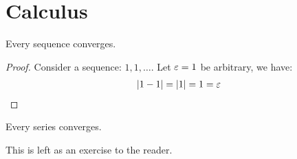 \setcounter{section}{0}

\section{Calculus}

\begin{thm}
  Every sequence converges.
\end{thm}
\begin{proof}
  Consider a sequence: $1,1,\ldots$. Let $\varepsilon=1$ be arbitrary, 
  we have:
  \begin{align*}
    |1-1| = |1| = 1 = \varepsilon
  \end{align*}
\end{proof}
\vspace{-0.5cm}
\setcounter{lem}{0}
\begin{cor}
  Every series converges.
\end{cor}
This is left as an exercise to the reader.
